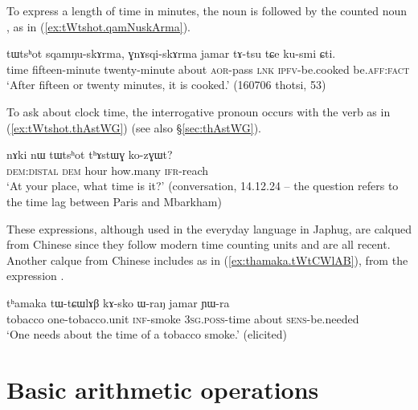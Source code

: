 To express a length of time in minutes, the noun    is followed by the counted noun , as in (\ref{ex:tWtshot.qamNuskArma}).
  
\begin{exe}
\ex \label{ex:tWtshot.qamNuskArma}
\gll  tɯtsʰot sqamŋu-skɤrma, ɣnɤsqi-skɤrma jamar tɤ-tsu tɕe ku-smi ɕti. \\
 time fifteen-minute twenty-minute about \textsc{aor}-pass \textsc{lnk} \textsc{ipfv}-be.cooked be.\textsc{aff}:\textsc{fact} \\
\glt `After fifteen or twenty minutes, it is cooked.' (160706 thotsi, 53)
\end{exe}

To ask about clock time, the interrogative pronoun  occurs with the verb  as in (\ref{ex:tWtshot.thAstWG}) (see also §\ref{sec:thAstWG}).

\begin{exe}
\ex \label{ex:tWtshot.thAstWG}
\gll     nɤki nɯ tɯtsʰot tʰɤstɯɣ ko-zɣɯt? \\
 \textsc{dem}:\textsc{distal} \textsc{dem} hour how.many \textsc{ifr}-reach \\
\glt  `At your place, what time is it?' (conversation, 14.12.24 -- the question refers to the time lag between Paris and Mbarkham)
\end{exe}
    
These expressions, although used in the everyday language in Japhug, are calqued from Chinese since they follow modern time counting units and are all recent. Another calque from Chinese includes  as in  (\ref{ex:thamaka.tWtCWlAB}), from the expression .
 

\begin{exe}
\ex \label{ex:thamaka.tWtCWlAB}
\gll    tʰamaka tɯ-tɕɯlɤβ kɤ-sko ɯ-raŋ jamar ɲɯ-ra \\
tobacco  one-tobacco.unit \textsc{inf}-smoke \textsc{3sg}.\textsc{poss}-time about \textsc{sens}-be.needed \\
\glt `One needs about the time of a tobacco smoke.' (elicited)
\end{exe}
    
\section{Basic arithmetic operations} \label{sec:arithmetic}

